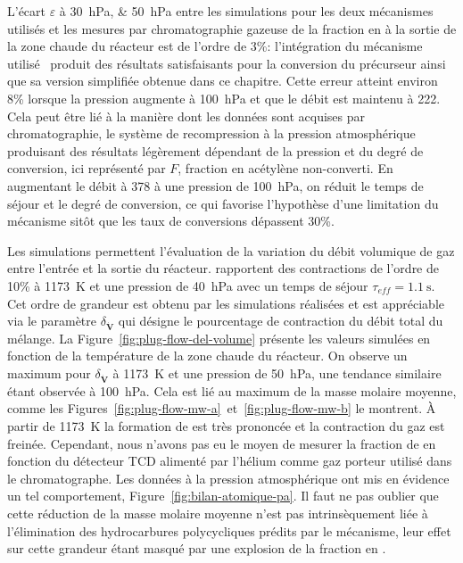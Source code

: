 L'écart $\varepsilon$ à \SIlist{30;50}{\hecto\pascal} entre les simulations \textendash{} pour les deux mécanismes utilisés \textendash{} et les mesures par chromatographie gazeuse de la fraction en  à la sortie de la zone chaude du réacteur est de l'ordre de 3\%: l'intégration du mécanisme utilisé~\cite{Norinaga2009} produit des résultats satisfaisants pour la conversion du précurseur  ainsi que sa version simplifiée obtenue dans ce chapitre. Cette erreur atteint environ 8\% lorsque la pression augmente à \SI{100}{\hecto\pascal} et que le débit est maintenu à \SI{222}{\sccm}. Cela peut être lié à la manière dont les données sont acquises par chromatographie, le système de recompression à la pression atmosphérique produisant des résultats légèrement dépendant de la pression et du degré de conversion, ici représenté par $F$, fraction en acétylène non-converti. En augmentant le débit à \SI{378}{\sccm} à une pression de \SI{100}{\hecto\pascal}, on réduit le temps de séjour et le degré de conversion, ce qui favorise l'hypothèse d'une limitation du mécanisme sitôt que les taux de conversions dépassent 30\%.

Les simulations permettent l'évaluation de la variation du débit volumique de gaz entre l'entrée et la sortie du réacteur. \citet{Norinaga2005} rapportent des contractions de l'ordre de 10\% à \SI{1173}{\kelvin} et une pression de \SI{40}{\hecto\pascal} avec un temps de séjour $\tau_{eff}=\SI{1,1}{\second}$. Cet ordre de grandeur est obtenu par les simulations réalisées et est appréciable via le paramètre $\delta_{\mathbf{\dot{V}}}$ qui désigne le pourcentage de contraction du débit total du mélange. La Figure~\ref{fig:plug-flow-del-volume} présente les valeurs simulées en fonction de la température de la zone chaude du réacteur. On observe un maximum pour $\delta_{\mathbf{\dot{V}}}$ à \SI{1173}{\kelvin} et une pression de \SI{50}{\hecto\pascal}, une tendance similaire étant observée à \SI{100}{\hecto\pascal}. Cela est lié au maximum de la masse molaire moyenne, comme les Figures~\ref{fig:plug-flow-mw-a}~et~\ref{fig:plug-flow-mw-b} le montrent. À partir de \SI{1173}{\kelvin} la formation de  est très prononcée et la contraction du gaz est freinée. Cependant, nous n'avons pas eu le moyen de mesurer la fraction de  en fonction du détecteur TCD alimenté par l'hélium comme gaz porteur utilisé dans le chromatographe. Les données à la pression atmosphérique ont mis en évidence un tel comportement, Figure~\ref{fig:bilan-atomique-pa}. Il faut ne pas oublier que cette réduction de la masse molaire moyenne n'est pas intrinsèquement liée à l'élimination des hydrocarbures polycycliques prédits par le mécanisme, leur effet sur cette grandeur étant masqué par une \og{}explosion\fg{} de la fraction en .

